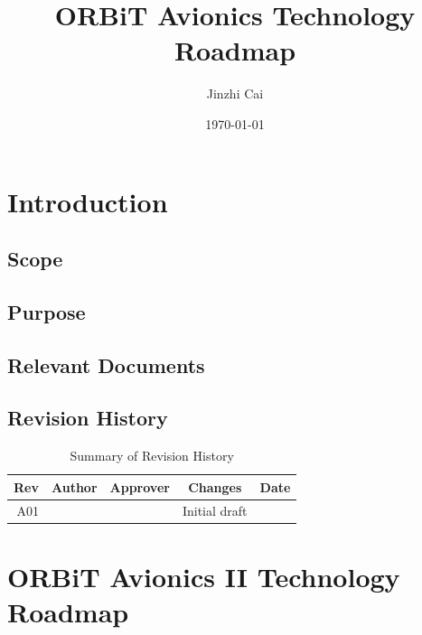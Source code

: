 \documentclass[12pt,article]{memoir}
\title{ORBiT Avionics Technology Roadmap}
\author{Jinzhi Cai}
\date{\today}
\begin{document}


\tableofcontents*
\clearpage


\chapter{Introduction}
\section{Scope}

\section{Purpose}

\section{Relevant Documents}

\section{Revision History}
\begin{table}[H]
	\centering
	\begin{tabu}{r || c | c | c | c }
		Rev & Author & Approver & Changes & Date\\ \hline
		A01 & & & Initial draft & \\
	\end{tabu}
	\caption{Summary of Revision History}
	\label{tab:rev}
\end{table}

\chapter{ORBiT Avionics II Technology Roadmap}
\end{document}
